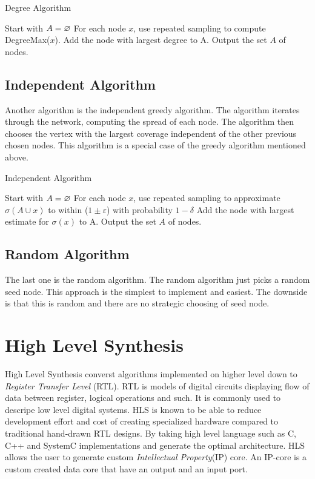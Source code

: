 \begin{algorithm}
\caption{Degree Algorithm}
\begin{algorithmic}[1]
\State Start with $A = \oldemptyset$
\State For each node $x$, use repeated sampling to compute DegreeMax($x$).
\State Add the node with largest degree to A.
\EndWhile
\State Output the set $A$ of nodes.
\end{algorithmic}
\end{algorithm}

\subsection{Independent Algorithm}
Another algorithm is the independent greedy algorithm. The algorithm iterates through the network, computing the spread of each node. The algorithm then chooses the vertex with the largest coverage independent of the other previous chosen nodes. This algorithm is a special case of the greedy algorithm mentioned above.

\begin{algorithm}
\caption{Independent Algorithm}
\begin{algorithmic}[1]
\State Start with $A = \oldemptyset$
\State For each node $x$, use repeated sampling to approximate $\sigma(A \cup {x}) $ to within ($1 \pm \varepsilon$) with probability
$1 − \delta$
\State Add the node with largest estimate for $\sigma({x})$ to A.
\EndWhile
\State Output the set $A$ of nodes.
\end{algorithmic}
\end{algorithm}




\subsection{Random Algorithm}
The last one is the random algorithm. The random algorithm just picks a random seed node. This approach is the simplest to implement and easiest. The downside is that this is random and there are no strategic choosing of seed node. 

 
 
\section{High Level Synthesis}

High Level Synthesis converst algorithms implemented on higher level down to \textit{Register Transfer Level} (RTL)\cite{HLSTutorial}. RTL is models of digital circuits displaying flow of data between register, logical operations and such. It is commonly used to descripe low level digital systems. HLS is known to be able to reduce development effort and cost of creating specialized hardware compared to traditional hand-drawn RTL designs\cite{zhao2016improving}\cite{Zuo:2013:IHL:2435264.2435271}\cite{HLSTutorial}. By taking high level language such as C, C++ and SystemC implementations and generate the optimal architecture. HLS allows the user to generate custom \textit{Intellectual Property}(IP) core. An IP-core is a custom created data core that have an output and an input port.


